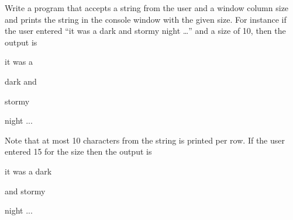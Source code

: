 Write a program that accepts a string from the user and a window column size and prints the string in the console window with the given size. For instance if the user entered ``it was a dark and stormy night \ldots'' and a size of 10, then the output is



\begin{consolethree}[escapeinside=||]

it was a

dark and

stormy

night ...

\end{consolethree}



Note that at most 10 characters from the string is printed per row. If the user entered 15 for the size then the output is



\begin{consolethree}[escapeinside=||]

it was a dark

and stormy

night ...

\end{consolethree}

